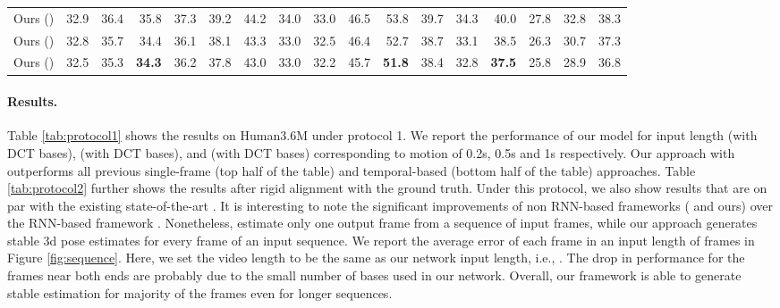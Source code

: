 \documentclass{bmvc2k}
\begin{document}
\begin{table*}[t]
{\begin{tabular}{l|rrrrrrrrrrrrrrr|r}
            Ours () & 32.9 & 36.4 & 35.8 & 37.3 & 39.2 & 44.2 & 34.0 & 33.0 & 46.5 & 53.8 & 39.7 & 34.3 & 40.0 & 27.8 & 32.8 & 38.3\\
            Ours () & 32.8 & 35.7 & 34.4 & 36.1 & 38.1 & 43.3 & 33.0 & 32.5 & 46.4 & 52.7 & 38.7 & 33.1 & 38.5 & 26.3 & 30.7 & 37.3\\
            Ours () & 32.5 & 35.3 & \textbf{34.3} & 36.2 & 37.8 & 43.0 & 33.0 & 32.2 & 45.7 & \textbf{51.8} & 38.4 & 32.8 & \textbf{37.5} & 25.8 & 28.9 & 36.8\\
            \hline
        \end{tabular}
    }
    \caption{Results on Human3.6M under Protocol 2 (after rigid alignment for post-processing). Top half of the table are single-frame works. Bottom half of the table are multi-frame works. Bold-faced numbers indicate best results.}
    \label{tab:protocol2}
\end{table*}

\paragraph{Results.} Table \ref{tab:protocol1} shows the results on Human3.6M under protocol 1. We report the performance of our model for input length  (with  DCT bases),  (with  DCT bases), and  (with  DCT bases) corresponding to motion of 0.2s, 0.5s and 1s respectively. Our approach with  outperforms all previous single-frame (top half of the table) and temporal-based (bottom half of the table) approaches. Table \ref{tab:protocol2} further shows the results after rigid alignment with the ground truth. Under this protocol, we also show results that are on par with the existing state-of-the-art \cite{pavllo20183d,dabral2018learning}. It is interesting to note the significant improvements of non RNN-based frameworks (\cite{pavllo20183d, dabral2018learning} and ours) over the RNN-based framework \cite{hossain2018exploiting}. Nonetheless, \cite{pavllo20183d, dabral2018learning} estimate only one output frame from a sequence of input frames, while our approach generates stable 3d pose estimates for every frame of an input sequence.
We report the average error of each frame in an input length of  frames in Figure \ref{fig:sequence}. Here, we set the video length to be the same as our network input length, i.e., .  
The drop in performance for the frames near both ends are probably due to the small number of bases used in our network.
Overall, our framework is able to generate stable estimation for majority of the frames even for longer sequences.
\end{document}
